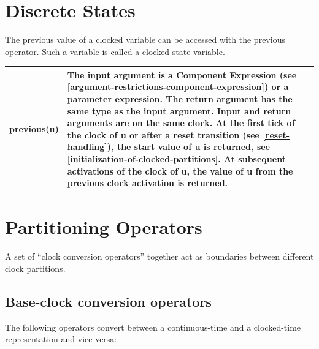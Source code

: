 \documentclass[10pt,a4paper]{report}
\def\doublelabel#1{\label{#1}}
\begin{document}
\section{Discrete States}\doublelabel{discrete-states}

The previous value of a clocked variable can be accessed with the
previous operator. Such a variable is called a clocked state variable.

\begin{longtable}[]{|l|p{12cm}|}
\hline \endhead
\textbf{previous}(u) & The input argument is a Component Expression (see
\ref{argument-restrictions-component-expression}) or a parameter expression. The return argument has the
same type as the input argument. Input and return arguments are on the
same clock. At the first tick of the clock of u or after a reset
transition (see \ref{reset-handling}), the start value of u is returned, see
\ref{initialization-of-clocked-partitions}. At subsequent activations of the clock of u, the value of
u from the previous clock activation is returned.\\ \hline
\end{longtable}

\section{Partitioning Operators}\doublelabel{partitioning-operators}

A set of ``clock conversion operators'' together act as boundaries
between different clock partitions.

\subsection{Base-clock conversion operators}\doublelabel{base-clock-conversion-operators}

The following operators convert between a continuous-time and a
clocked-time representation and vice versa:
\end{document}

